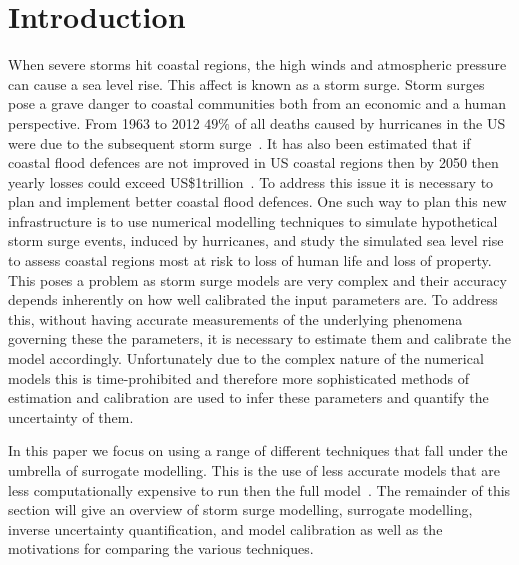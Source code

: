 \documentclass[12pt,a4paper]{article}
\begin{document}
\section{Introduction}\label{sec:intro}
\noindent
When severe storms hit coastal regions, the high winds and atmospheric pressure can cause a sea level rise. This affect is known as a storm surge. Storm surges pose a grave danger to coastal communities both from an economic and a human perspective. From 1963 to 2012 $49\%$ of all deaths caused by hurricanes in the US were due to the subsequent storm surge~\cite{deaths}. It has also been estimated that if coastal flood defences are not improved in US coastal regions then by 2050 then yearly losses could exceed US\$1trillion~\cite{costs}.  To address this issue it is necessary to plan and implement better coastal flood defences. One such way to plan this new infrastructure is to use numerical modelling techniques to simulate hypothetical storm surge events, induced by hurricanes, and study the simulated sea level rise to assess coastal regions most at risk to loss of human life and loss of property. This poses a problem as storm surge models are very complex and their accuracy depends inherently on how well calibrated the input parameters are. To address this, without having accurate measurements of the underlying phenomena governing these the parameters, it is necessary to estimate them and calibrate the model accordingly. Unfortunately due to the complex nature of the numerical models this is time-prohibited and therefore more sophisticated methods of estimation and calibration are used to infer these parameters and quantify the uncertainty of them.

In this paper we focus on using a range of different techniques that fall under the umbrella of surrogate modelling. This is the use of less accurate models that are less computationally expensive to run then the full model~\cite{quirante}. The remainder of this section will give an overview of storm surge modelling, surrogate modelling, inverse uncertainty quantification, and model calibration as well as the motivations for comparing the various techniques.
\end{document}
